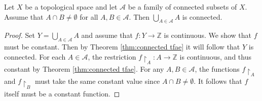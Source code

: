 \documentclass[a4paper]{article}
\begin{document}
\begin{lemma}\label{lma:union connected}
    Let $X$ be a topological space and let $\mathcal{A}$ be a family of connected subsets of $X$. Assume that $A \cap B \neq \emptyset$ for all $A, B \in \mathcal{A}$. Then $\bigcup_{A \in \mathcal{A}} A$ is connected.
\end{lemma}

\begin{proof}
    Set $Y=\bigcup_{A \in \mathcal{A}} A$ and assume that $f: Y \rightarrow \mathbb{Z}$ is continuous. We show that $f$ must be constant. Then by Theorem \ref{thm:connected tfae} it will follow that $Y$ is connected. For each $A \in \mathcal{A}$, the restriction $f\restriction_{A}: A \rightarrow \mathbb{Z}$ is continuous, and thus constant by Theorem \ref{thm:connected tfae}. For any $A, B \in \mathcal{A}$, the functions $f\restriction_{A}$ and $f\restriction_{B}$ must take the same constant value since $A \cap B \neq \emptyset$. It follows that $f$ itself must be a constant function.
\end{proof}
\end{document}
